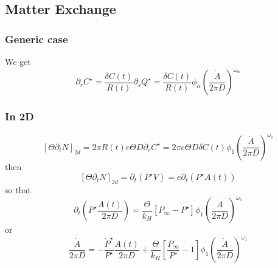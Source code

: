 \documentclass[11pt]{revtex4}
\begin{document}
\subsection{Matter Exchange}
\subsubsection{Generic case}
We get
\begin{equation}
	\partial_r C^\star = \dfrac{\delta C(t)}{R(t)} \partial_s Q^\star = \dfrac{\delta C(t)}{R(t)} \phi_\alpha \left(\dfrac{\dot{A}}{2\pi D}\right)^{\omega_\alpha}
\end{equation}

\subsubsection{In 2D}
\begin{equation}	
	\label{eq:xch2d}
	\left\lbrack \Theta \partial_t N\right\rbrack_{2d} 
	= 2\pi R(t) e \Theta D \partial_r C^\star
	=  2\pi e \Theta D \delta C(t) \phi_1 \left(\dfrac{\dot{A}}{2\pi D}\right)^{\omega_1}
\end{equation}
then
\begin{equation}
	\left\lbrack \Theta \partial_t N\right\rbrack_{2d} = \partial_t\left(P^\star V\right) = e \partial_t\left(P^\star A(t)\right)
\end{equation}
so that
\begin{equation}
	\partial_t \left( P^\star \dfrac{A(t)}{2\pi D}\right) = \dfrac{\Theta}{k_H}  \left[P_\infty- P^\star\right] \phi_1 \left(\dfrac{\dot{A}}{2\pi D}\right)^{\omega_1}
\end{equation}
or
\begin{equation}
	\label{eq:drive2d}
	\dfrac{\dot{A}}{2\pi D} = -\dfrac{\dot{P}^\star}{P^\star} \dfrac{A(t)}{2\pi D} + \dfrac{\Theta}{k_H}  \left[\dfrac{P_\infty}{P^\star}-1\right] \phi_1 \left(\dfrac{\dot{A}}{2\pi D}\right)^{\omega_1}
\end{equation}
\end{document}
